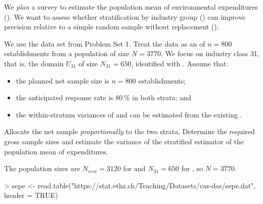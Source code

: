 




\begin{Problem}\label{problem:stsi_plan}
    We \emph{plan} a survey to estimate the population mean of environmental
    expenditures (). We want to assess whether stratification by
    industry group () can improve precision relative to a simple
    random sample without replacement (\SRS).

    \vspace{0.5em}

    We use the data set  from Problem Set 1. Treat the data as
    an \SRS of $n = 800$ establishments from a population of size $N = 3770$. We
    focus on industry class 31, that is, the domain $U_{31}$ of size $N_{31} =
    650$, identified with . Assume that:
    \begin{itemize}
        \item the planned net sample size is $n=800$ establishments;
        \item the anticipated response rate is 80\,\% in both strata; and
        \item the within-stratum variances of  and  can
            be estimated from the existing \SRS \; .
    \end{itemize}

\begin{Subtask}
    \item Allocate the net sample \emph{proportionally} to the two strata.
        Determine the required gross sample sizes and estimate the variance of
        the stratified estimator of the population mean of expenditures.

    \begin{Solution}
        The population sizes are $N_{rest} = 3120$ for  and
        $N_{31} = 650$ for , so $N = 3770$.


\begin{Schunk}
\begin{Sinput}
> sepe <- read.table("https://stat.ethz.ch/Teaching/Datasets/cas-das/sepe.dat",
                     header = TRUE)
\end{Sinput}
\end{Schunk}


\end{Solution}
\end{Subtask}
\end{Problem}
